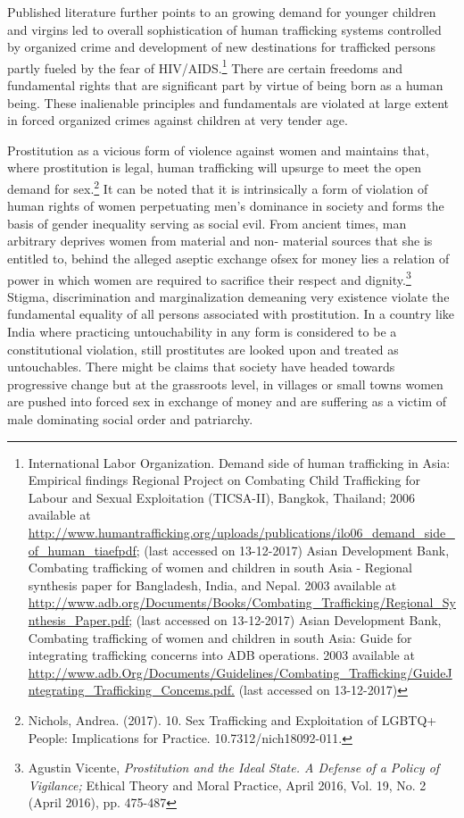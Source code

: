 \begin{multicols}{2}
\noi
Published literature further points to an growing demand for younger children and virgins led
to overall sophistication of human trafficking systems controlled by organized crime and
development of new destinations for trafficked persons partly fueled by the fear of HIV/AIDS.\footnote{International Labor Organization. Demand side of human trafficking in Asia: Empirical findings Regional Project on Combating Child Trafficking for Labour and Sexual Exploitation (TICSA-II), Bangkok, Thailand; 2006 available at  \url{http://www.humantrafficking.org/uploads/publications/ilo06_demand_side_of_human_tiaefpdf;} (last accessed on 13-12-2017) Asian Development Bank, Combating trafficking of women and children in south Asia - Regional synthesis paper for Bangladesh, India, and Nepal. 2003 available at \url{http://www.adb.org/Documents/Books/Combating_Trafficking/Regional_Synthesis_Paper.pdf;} (last accessed on 13-12-2017) Asian Development Bank, Combating trafficking of women and children in south Asia: Guide for integrating trafficking concerns into ADB operations. 2003 available at \url{http://www.adb.Org/Documents/Guidelines/Combating_Trafficking/GuideJntegrating_Trafficking_Concems.pdf.} (last accessed on 13-12-2017)} There are certain freedoms and fundamental rights that are significant part by virtue of being born as a human being. These inalienable principles and fundamentals are violated at large extent in forced organized crimes against children at very tender age.

\noi
Prostitution as a vicious form of violence against women and maintains that, where prostitution
is legal, human trafficking will upsurge to meet the open demand for sex.\footnote{Nichols, Andrea. (2017). 10. Sex Trafficking and Exploitation of LGBTQ+ People: Implications for Practice.
10.7312/nich18092-011.} It can be noted that
it is intrinsically a form of violation of human rights of women perpetuating men's dominance
in society and forms the basis of gender inequality serving as social evil. From ancient times,
man arbitrary deprives women from material and non- material sources that she is entitled to,
behind the alleged aseptic exchange ofsex for money lies a relation of power in which women
are required to sacrifice their respect and dignity.\footnote{Agustin Vicente, \textit{Prostitution and the Ideal State. A Defense of a Policy of Vigilance;} Ethical Theory and Moral Practice, April 2016, Vol. 19, No. 2 (April 2016), pp. 475-487} Stigma, discrimination and marginalization
demeaning very existence violate the fundamental equality of all persons associated with
prostitution. In a country like India where practicing untouchability in any form is considered
to be a constitutional violation, still prostitutes are looked upon and treated as untouchables.
There might be claims that society have headed towards progressive change but at the
grassroots level, in villages or small towns women are pushed into forced sex in exchange of
money and are suffering as a victim of male dominating social order and patriarchy.


\end{multicols}
